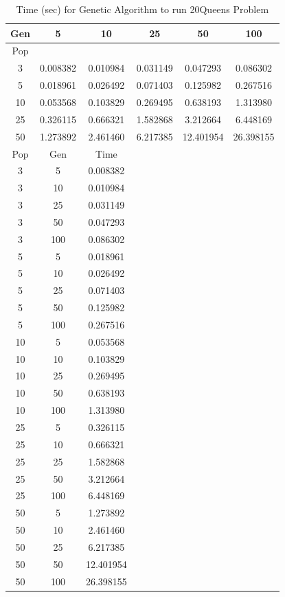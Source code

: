 \documentclass[11pt]{article}
\begin{document}
\begin{table}
\centering
\caption{Time (sec) for Genetic Algorithm to run 20Queens Problem}
\begin{tabular}{|c||| c | c | c | c | c |} %
\hline %
Gen &       5   &       10  &       25  &        50  &        100 \\
   \hline
Pop &           &           &           &            &            \\
   \hline \hline
3   &  0.008382 &  0.010984 &  0.031149 &   0.047293 &   0.086302 \\
   \hline
5   &  0.018961 &  0.026492 &  0.071403 &   0.125982 &   0.267516 \\
   \hline
10  &  0.053568 &  0.103829 &  0.269495 &   0.638193 &   1.313980 \\
   \hline
25  &  0.326115 &  0.666321 &  1.582868 &   3.212664 &   6.448169 \\
   \hline
50  &  1.273892 &  2.461460 &  6.217385 &  12.401954 &  26.398155 \\
   \hline \hline

\hline %
 Pop &  Gen &       Time \\
   \hline \hline
   3 &    5 &   0.008382 \\
\hline
   3 &   10 &   0.010984 \\
\hline
   3 &   25 &   0.031149 \\
\hline
   3 &   50 &   0.047293 \\
\hline
   3 &  100 &   0.086302 \\
\hline
   5 &    5 &   0.018961 \\
\hline
   5 &   10 &   0.026492 \\
\hline
   5 &   25 &   0.071403 \\
\hline
   5 &   50 &   0.125982 \\
\hline
   5 &  100 &   0.267516 \\
\hline
  10 &    5 &   0.053568 \\
\hline
  10 &   10 &   0.103829 \\
\hline
  10 &   25 &   0.269495 \\
\hline
  10 &   50 &   0.638193 \\
\hline
  10 &  100 &   1.313980 \\
\hline
  25 &    5 &   0.326115 \\
\hline
  25 &   10 &   0.666321 \\
\hline
  25 &   25 &   1.582868 \\
\hline
  25 &   50 &   3.212664 \\
\hline
  25 &  100 &   6.448169 \\
\hline
  50 &    5 &   1.273892 \\
\hline
  50 &   10 &   2.461460 \\
\hline
  50 &   25 &   6.217385 \\
\hline
  50 &   50 &  12.401954 \\
\hline
  50 &  100 &  26.398155 \\
\hline
   \end{tabular}
\label{tab:pd} 
\end{table}
\end{document}
